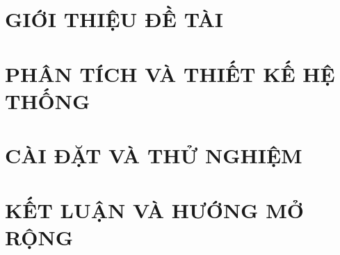 \documentclass[12pt,a4paper,oneside]{report}
\begin{document}
\tableofcontents
\clearpage
\listoffigures
\clearpage
\listoftables
\clearpage


\chapter{GIỚI THIỆU ĐỀ TÀI}


\chapter{PHÂN TÍCH VÀ THIẾT KẾ HỆ THỐNG}









\chapter{CÀI ĐẶT VÀ THỬ NGHIỆM}


\chapter{KẾT LUẬN VÀ HƯỚNG MỞ RỘNG}

\end{document}
